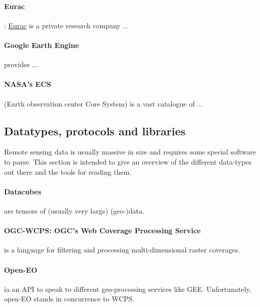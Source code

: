 \paragraph{Eurac}: \href{http://www.eurac.edu}{Eurac} is a private research company ...

\paragraph{Google Earth Engine} provides ...

\paragraph{NASA's ECS} (Earth observation center Core System) is a vast catalogue of ...






\subsection{Datatypes, protocols and libraries}

Remote sensing data is usually massive in size and requires some special software to parse.
This section is intended to give an overview of the different data-types out there and the tools for reading them. 

\paragraph{Datacubes} are tensors of (usually very large) (geo-)data.

\paragraph{OGC-WCPS: OGC's Web Coverage Processing Service} is a language for filtering and processing multi-dimensional raster coverages. 

\paragraph{Open-EO} ia an API to speak to different geo-processing services like GEE. Unfortunately, open-EO stands in concurrence to WCPS. 

